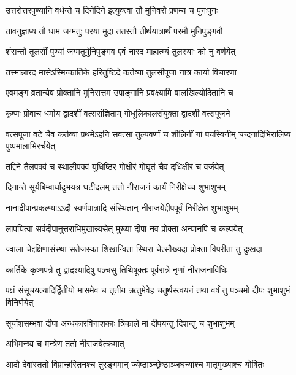 \twolineshloka
{उत्तरोत्तरपुण्यानि वर्धन्ते च दिनेदिने}
{इत्युक्त्वा तौ मुनिवरौ प्रणम्य च पुनःपुनः} %

\twolineshloka
{तावनुज्ञाप्य तौ धाम जग्मतुः परया मुदा}
{ततस्तौ तीर्थयात्रार्थं परमौ मुनिपुङ्गवौ} %

\twolineshloka
{शंसन्तौ तुलसीं पुण्यां जग्मतुर्मुनिपुङ्गव}
{एवं नारद माहात्म्यं तुलस्याः को नु वर्णयेत्} %

\twolineshloka
{तस्मान्नारद मासेऽस्मिन्कार्तिके हरितुष्टिदे}
{कर्तव्या तुलसीपूजा नात्र कार्या विचारणा} %

\twolineshloka
{एवमङ्ग व्रतान्येव प्रोक्तानि मुनिसत्तम}
{उपाङ्गानि प्रवक्ष्यामि वालखिल्योदितानि च} %





\twolineshloka
{कृष्णः प्रोवाच धर्माय द्वादशीं वत्ससंज्ञिताम्}
{गोधूलिकालसंयुक्ता द्वादशी वत्सपूजने} %

\threelineshloka
{वत्सपूजा वटे चैव कर्तव्या प्रथमेऽहनि}
{सवत्सां तुल्यवर्णां च शीलिनीं गां पयस्विनीम्}
{चन्दनादिभिरालिप्य पुष्पमालाभिरर्चयेत्} %

\twolineshloka
{तद्दिने तैलपक्वं च स्थालीपक्वं युधिष्ठिर}
{गोक्षीरं गोघृतं चैव दधिक्षीरं च वर्जयेत्} %

\twolineshloka
{दिनान्ते सूर्यबिम्बार्धादुभयत्र घटीदलम्}
{ततो नीराजनं कार्यं निरीक्षेच्च शुभाशुभम्} %

\twolineshloka
{नानादीपान्प्रकल्प्याऽऽदौ स्वर्णपात्रादि संस्थितान्}
{नीराजयेद्दीपपूर्वं निरीक्षेत शुभाशुभम्} %

\twolineshloka
{लापयित्वा सर्वदीपानुत्तराभिमुखान्न्यसेत्}
{मुख्या दीपा नव प्रोक्ता अन्यानपि च कल्पयेत्} %

\twolineshloka
{ज्वाला चेद्दक्षिणासंस्था सतेजस्का शिखान्विता}
{स्थिरा चेत्सौख्यदा प्रोक्ता विपरीता तु दुःखदा} %

\twolineshloka
{कार्तिके कृष्णपत्रे तु द्वादश्यादिषु पञ्चसु}
{तिथिषूक्तः पूर्वरात्रे नृणां नीराजनाविधिः} %

\threelineshloka
{पक्षं संसूचयत्यादिर्द्वितीयो मासमेव च}
{तृतीय ऋतुमेवेह चतुर्थस्त्वयनं तथा}
{वर्षं तु पञ्चमो दीपः शुभाशुभं विनिर्णयेत्} %

\twolineshloka
{सूर्यांशसम्भवा दीपा अन्धकारविनाशकाः}
{त्रिकाले मां दीपयन्तु दिशन्तु च शुभाशुभम्} %


\onelineshloka
{अभिमन्त्र्य च मन्त्रेण ततो नीराजयेत्क्रमात्} %

\twolineshloka
{आदौ देवांस्ततो विप्रान्हस्तिनश्च तुरङ्गमान्}
{ज्येष्ठाञ्च्छ्रेष्ठाञ्जघन्यांश्च मातृमुख्याश्च योषितः} %

